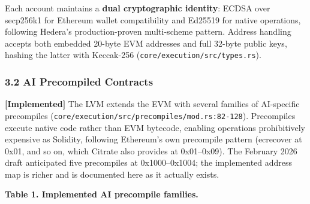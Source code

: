 Each account maintains a \textbf{dual cryptographic identity}: ECDSA
over secp256k1 for Ethereum wallet compatibility and Ed25519 for native
operations, following Hedera's production-proven multi-scheme pattern.
Address handling accepts both embedded 20-byte EVM addresses and full
32-byte public keys, hashing the latter with Keccak-256
(\texttt{core/execution/src/types.rs}).

\subsubsection{3.2 AI Precompiled
Contracts}\label{ai-precompiled-contracts}

\textbf{{[}Implemented{]}} The LVM extends the EVM with several families
of AI-specific precompiles
(\texttt{core/execution/src/precompiles/mod.rs:82-128}). Precompiles
execute native code rather than EVM bytecode, enabling operations
prohibitively expensive as Solidity, following Ethereum's own precompile
pattern (ecrecover at 0x01, and so on, which Citrate also provides at
0x01--0x09). The February 2026 draft anticipated five precompiles at
0x1000--0x1004; the implemented address map is richer and is documented
here as it actually exists.

\textbf{Table 1. Implemented AI precompile families.}

